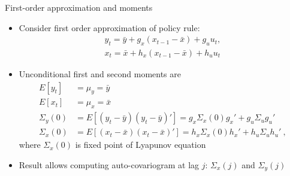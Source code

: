 \begin{frame}{First-order approximation and moments}
  \begin{itemize}
    \item Consider first order approximation of policy rule:
          \begin{align}
            y_t = \bar{y} + g_x(x_{t-1} - \bar{x}) + g_u u_t, \\
            x_t = \bar{x} + h_x(x_{t-1} - \bar{x}) + h_u u_t
          \end{align}
    \item Unconditional first and second moments are
          \begin{align}
            E\left[y_t\right]      & = \mu_y = \bar{y}                                                                                             \\
            E\left[x_t\right]      & = \mu_x = \bar{x}                                                                                             \\
            \Sigma_y\left(0\right) & = E\left[(y_t - \bar{y})(y_t - \bar{y})'\right] = g_{x} \Sigma_x\left(0\right)g_{x}' + g_u \Sigma_u g_u'      \\
            \Sigma_x\left(0\right) & = E\left[(x_t - \bar{x})(x_t - \bar{x})'\right] = h_{x} \Sigma_x\left(0\right)h_{x}' + h_u \Sigma_u h_u' \: ,
          \end{align}
          where $\Sigma_x(0)$ is fixed point of Lyapunov equation
    \item Result allows computing auto-covariogram at lag $j$: \(\Sigma_x(j)\) and \(\Sigma_y(j)\)
  \end{itemize}
\end{frame}



